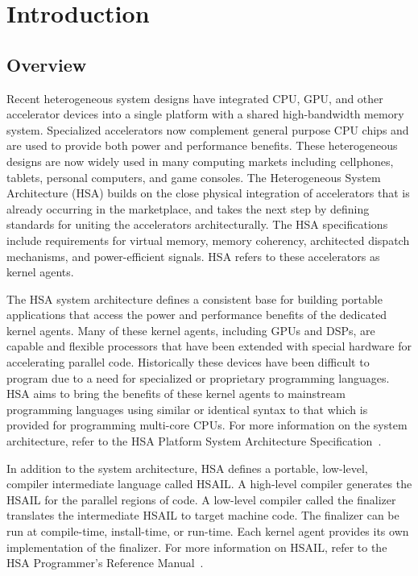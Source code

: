 \documentclass[final,oneside]{book}
\begin{document}
\clearpage
{}
\setcounter{page}{1}

\chapter{Introduction} \label{index}
\vspace{-7mm}
\section{Overview}\label{overview}
\vspace{-3mm}
Recent heterogeneous system designs have integrated CPU, GPU, and other
accelerator devices into a single platform with a shared high-bandwidth memory
system.  Specialized accelerators now complement general purpose CPU chips and
are used to provide both power and performance benefits.  These
heterogeneous designs are now widely used in many computing markets including
cellphones, tablets, personal computers, and game consoles. The Heterogeneous
System Architecture (HSA) builds on the close physical integration of
accelerators that is already occurring in the marketplace, and takes the next
step by defining standards for uniting the accelerators architecturally. The HSA
specifications include requirements for virtual memory, memory coherency,
architected dispatch mechanisms, and power-efficient signals. HSA refers to
these accelerators as kernel agents.

The HSA system architecture defines a consistent base for building portable
applications that access the power and performance benefits of the dedicated
kernel agents. Many of these kernel agents, including GPUs and DSPs, are capable
and flexible processors that have been extended with special hardware for
accelerating parallel code. Historically these devices have been difficult to
program due to a need for specialized or proprietary programming languages. HSA
aims to bring the benefits of these kernel agents to mainstream programming
languages using similar or identical syntax to that which is provided for
programming multi-core CPUs. For more information on the system architecture,
refer to the HSA Platform System Architecture Specification~\cite{sar}.

In addition to the system architecture, HSA defines a portable, low-level,
compiler intermediate language called HSAIL.  A high-level compiler
generates the HSAIL for the parallel regions of code. A low-level compiler
called the finalizer translates the intermediate HSAIL to target machine
code. The finalizer can be run at compile-time, install-time, or run-time. Each
kernel agent provides its own implementation of the finalizer.  For more
information on HSAIL, refer to the HSA Programmer's Reference Manual~\cite{prm}.
\end{document}
